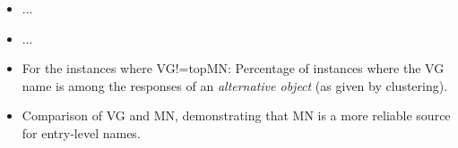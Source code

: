 




\begin{itemize}
	\item ...
	\item ...
	\item For the instances where VG!=topMN: Percentage of instances where the VG name is among the responses of an \textit{alternative object} (as given by clustering).
	\item Comparison of VG and MN, demonstrating that MN is a more reliable source for entry-level names. 
\end{itemize}


